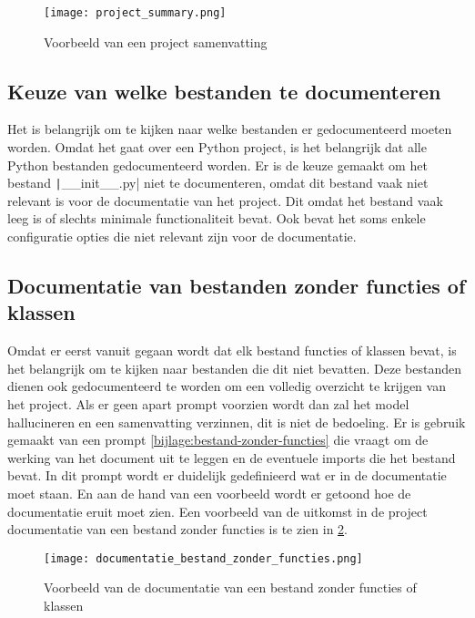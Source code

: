 \begin{figure}[h]
    \centering
    \texttt{[image: project\_summary.png]}
    \caption{Voorbeeld van een project samenvatting}
    \label{fig:project-summary}
\end{figure}    

\subsection{Keuze van welke bestanden te documenteren}
\label{subsec:project-documentatie-keuze-bestanden}

Het is belangrijk om te kijken naar welke bestanden er gedocumenteerd moeten worden.
Omdat het gaat over een Python project, is het belangrijk dat alle Python bestanden gedocumenteerd worden.
Er is de keuze gemaakt om het bestand \texttt|__init__.py| niet te documenteren, omdat dit bestand vaak niet relevant is voor de documentatie van het project.
Dit omdat het bestand vaak leeg is of slechts minimale functionaliteit bevat. 
Ook bevat het soms enkele configuratie opties die niet relevant zijn voor de documentatie.

\subsection{Documentatie van bestanden zonder functies of klassen}
\label{subsec:project-documentatie-geen-functies}

Omdat er eerst vanuit gegaan wordt dat elk bestand functies of klassen bevat, is het belangrijk om te kijken naar bestanden die dit niet bevatten.
Deze bestanden dienen ook gedocumenteerd te worden om een volledig overzicht te krijgen van het project.
Als er geen apart prompt voorzien wordt dan zal het model hallucineren en een samenvatting verzinnen, dit is niet de bedoeling.
Er is gebruik gemaakt van een prompt \ref{bijlage:bestand-zonder-functies} die vraagt om de werking van het document uit te leggen en de eventuele imports die het bestand bevat.
In dit prompt wordt er duidelijk gedefinieerd wat er in de documentatie moet staan. 
En aan de hand van een voorbeeld wordt er getoond hoe de documentatie eruit moet zien.
Een voorbeeld van de uitkomst in de project documentatie van een bestand zonder functies is te zien in \ref{fig:file-no-functions}.

\begin{figure}[h]
    \centering
    \texttt{[image: documentatie\_bestand\_zonder\_functies.png]}
    \caption{Voorbeeld van de documentatie van een bestand zonder functies of klassen}
    \label{fig:file-no-functions}
\end{figure}


